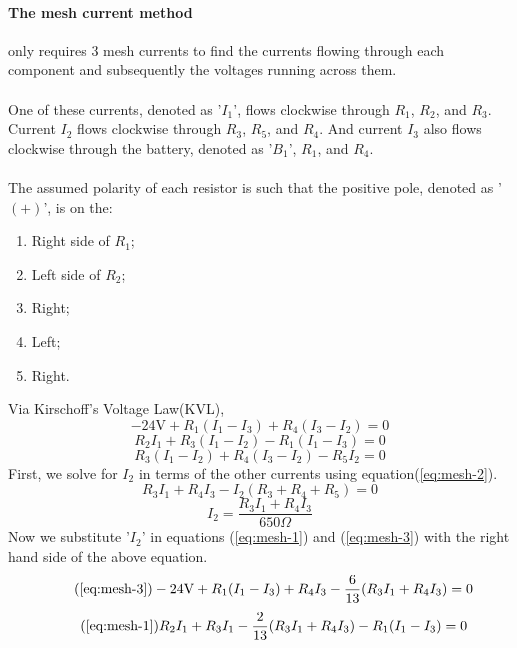 \documentclass{article}
\begin{document}
	\paragraph[Mesh]{The mesh current method} only requires 3 mesh currents to 
	find the 
	currents flowing through each component and subsequently the voltages 
	running across them. \\ \\
	One of these currents, denoted as '$I_1$', flows clockwise through $R_1$, 
	$R_2$, and $R_3$.  Current $I_2$ flows clockwise through $R_3$, $R_5$, and 
	$R_4$.  And current $I_3$ also flows clockwise through the battery, denoted 
	as '$B_1$', $R_1$, and $R_4$. \\ \\
	The assumed polarity of each resistor is such that the positive pole, 
	denoted as '$(+)$', is on the:
	\begin{enumerate}
		\item Right side of $R_1$;
		\item Left side of $R_2$;
		\item Right;
		\item Left;
		\item Right.
	\end{enumerate}
	Via Kirschoff's Voltage Law(KVL),
	\begin{equation}\label{eq:mesh-3}
		-24\text{V} + R_1(I_1-I_3) + R_4(I_3-I_2) = 0
	\end{equation}
	\begin{equation}\label{eq:mesh-1}
		R_2I_1 + R_3(I_1-I_2) - R_1(I_1-I_3) = 0
	\end{equation}
	\begin{equation}\label{eq:mesh-2}
		R_3(I_1-I_2) + R_4(I_3-I_2) - R_5I_2 = 0
	\end{equation}
	First, we solve for $I_2$ in terms of the other currents using 
	equation(\ref{eq:mesh-2}).
	$$ R_3I_1+R_4I_3-I_2(R_3 + R_4 + R_5) = 0$$
	\begin{equation}\label{eq:cur_2-in-cur_1-cur_3}
		I_2 = \frac{R_3I_1 + R_4I_3}{650\Omega}
	\end{equation}
	Now we substitute '$I_2$' in equations (\ref{eq:mesh-1}) and 
	(\ref{eq:mesh-3}) with the right hand side of the above equation.
	\begin{equation}\tag{\ref{eq:mesh-3}}
		-24\text{V} + R_1(I_1-I_3) + R_4I_3- \frac{6}{13}(R_3I_1 + R_4I_3) = 0
	\end{equation}
	\begin{equation}\tag{\ref{eq:mesh-1}}
		R_2I_1 + R_3I_1-\frac{2}{13}(R_3I_1 + R_4I_3) - R_1(I_1-I_3) = 0
	\end{equation}
\end{document}
